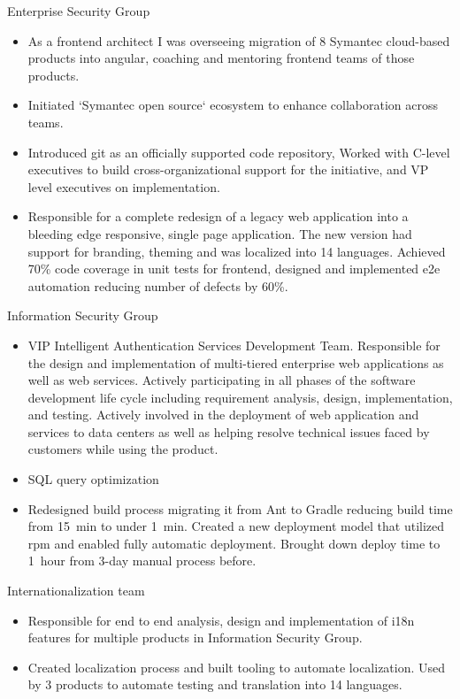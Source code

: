 \documentclass[11pt,a4paper,roman]{moderncv}       %
\begin{document}
{Enterprise Security Group
\begin{itemize}
    \item As a frontend architect I was overseeing migration of 8 Symantec cloud-based products into angular, coaching and mentoring frontend teams of those products. 
    \item Initiated `Symantec open source` ecosystem to enhance collaboration across teams. 
    \item Introduced git as an officially supported code repository, Worked with C-level executives to build cross-organizational support for the initiative, and VP level executives on implementation.
    \item Responsible for a complete redesign of a legacy web application into a bleeding edge responsive, single page application. The new version had support for branding, theming and was localized into 14 languages. Achieved 70\% code coverage in unit tests for frontend, designed and implemented e2e automation reducing number of defects by 60\%.
\end{itemize}

\medskip

Information Security Group

\begin{itemize}
    \item VIP Intelligent Authentication Services Development Team. Responsible for the design and implementation of multi-tiered enterprise web applications as well as web services. Actively participating in all phases of the software development life cycle including requirement analysis, design, implementation, and testing. Actively involved in the deployment of web application and services to data centers as well as helping resolve technical issues faced by customers while using the product.
    \item SQL query optimization
    \item Redesigned build process migrating it from Ant to Gradle reducing build time from 15~min to under 1~min. Created a new deployment model that utilized rpm and enabled fully automatic deployment. Brought down deploy time to 1~hour from 3-day manual process before.
\end{itemize}

\medskip

Internationalization team

\begin{itemize}
    \item Responsible for end to end analysis, design and implementation of i18n features for multiple products in Information Security Group.
    \item Created localization process and built tooling to automate localization. Used by 3 products to automate testing and translation into 14 languages.
\end{itemize}

}
\end{document}
